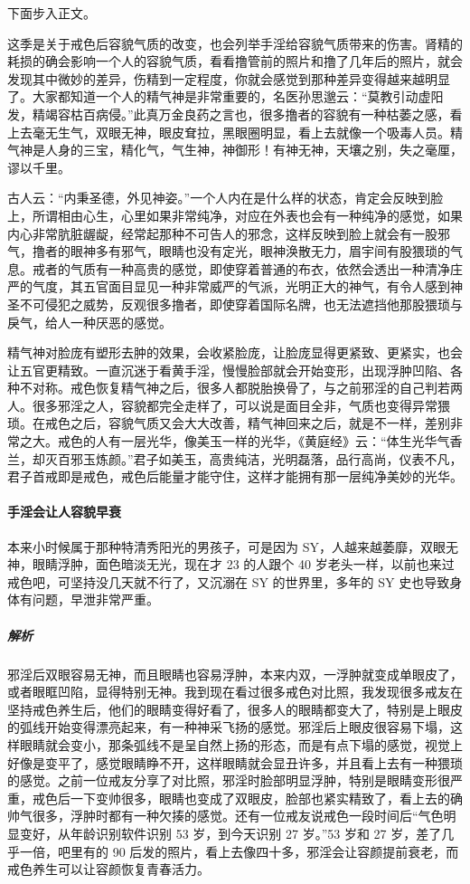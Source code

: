 下面步入正文。

这季是关于戒色后容貌气质的改变，也会列举手淫给容貌气质带来的伤害。肾精的耗损的确会影响一个人的容貌气质，看看撸管前的照片和撸了几年后的照片，就会发现其中微妙的差异，伤精到一定程度，你就会感觉到那种差异变得越来越明显了。大家都知道一个人的精气神是非常重要的，名医孙思邈云：“莫教引动虚阳发，精竭容枯百病侵。”此真万金良药之言也，很多撸者的容貌有一种枯萎之感，看上去毫无生气，双眼无神，眼皮耷拉，黑眼圈明显，看上去就像一个吸毒人员。精气神是人身的三宝，精化气，气生神，神御形！有神无神，天壤之别，失之毫厘，谬以千里。

古人云：“内秉圣德，外见神姿。”一个人内在是什么样的状态，肯定会反映到脸上，所谓相由心生，心里如果非常纯净，对应在外表也会有一种纯净的感觉，如果内心非常肮脏龌龊，经常起那种不可告人的邪念，这样反映到脸上就会有一股邪气，撸者的眼神多有邪气，眼睛也没有定光，眼神涣散无力，眉宇间有股猥琐的气息。戒者的气质有一种高贵的感觉，即使穿着普通的布衣，依然会透出一种清净庄严的气度，其五官面目显见一种非常威严的气派，光明正大的神气，有令人感到神圣不可侵犯之威势，反观很多撸者，即使穿着国际名牌，也无法遮挡他那股猥琐与戾气，给人一种厌恶的感觉。

精气神对脸庞有塑形去肿的效果，会收紧脸庞，让脸庞显得更紧致、更紧实，也会让五官更精致。一直沉迷于看黄手淫，慢慢脸部就会开始变形，出现浮肿凹陷、各种不对称。戒色恢复精气神之后，很多人都脱胎换骨了，与之前邪淫的自己判若两人。很多邪淫之人，容貌都完全走样了，可以说是面目全非，气质也变得异常猥琐。在戒色之后，容貌气质又会大大改善，精气神回来之后，就是不一样，差别非常之大。戒色的人有一层光华，像美玉一样的光华，《黄庭经》云：“体生光华气香兰，却灭百邪玉炼颜。”君子如美玉，高贵纯洁，光明磊落，品行高尚，仪表不凡，君子首戒即是戒色，戒色后能量才能守住，这样才能拥有那一层纯净美妙的光华。

\paragraph{手淫会让人容貌早衰}

\begin{case}
    本来小时候属于那种特清秀阳光的男孩子，可是因为 SY，人越来越萎靡，双眼无神，眼睛浮肿，面色暗淡无光，现在才 23 的人跟个 40 岁老头一样，以前也来过戒色吧，可坚持没几天就不行了，又沉溺在 SY 的世界里，多年的 SY 史也导致身体有问题，早泄非常严重。
    \subparagraph{解析} 邪淫后双眼容易无神，而且眼睛也容易浮肿，本来内双，一浮肿就变成单眼皮了，或者眼眶凹陷，显得特别无神。我到现在看过很多戒色对比照，我发现很多戒友在坚持戒色养生后，他们的眼睛变得好看了，很多人的眼睛都变大了，特别是上眼皮的弧线开始变得漂亮起来，有一种神采飞扬的感觉。邪淫后上眼皮很容易下塌，这样眼睛就会变小，那条弧线不是呈自然上扬的形态，而是有点下塌的感觉，视觉上好像是变平了，感觉眼睛睁不开，这样眼睛就会显丑许多，并且看上去有一种猥琐的感觉。之前一位戒友分享了对比照，邪淫时脸部明显浮肿，特别是眼睛变形很严重，戒色后一下变帅很多，眼睛也变成了双眼皮，脸部也紧实精致了，看上去的确帅气很多，浮肿时都有一种欠揍的感觉。还有一位戒友说戒色一段时间后“气色明显变好，从年龄识别软件识别 53 岁，到今天识别 27 岁。”53 岁和 27 岁，差了几乎一倍，吧里有的 90 后发的照片，看上去像四十多，邪淫会让容颜提前衰老，而戒色养生可以让容颜恢复青春活力。
\end{case}

